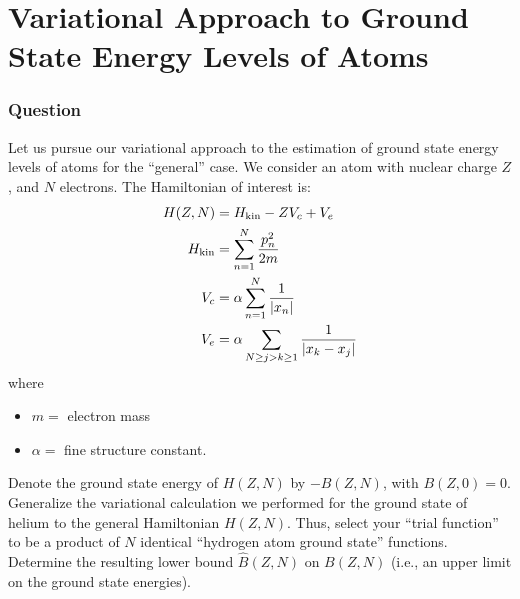 \documentclass{article}[16pt]
\begin{document}
\section{Variational Approach to Ground State Energy Levels of Atoms}
\subsubsection{Question}
Let us pursue our variational approach to the estimation of ground state energy levels of atoms for the “general” case. We consider an atom with nuclear charge $Z$, and $N$ electrons. The Hamiltonian of interest is:
\begin{align*}
    H(Z, N) &= H_{\text{kin}} - ZV_c + V_e \\
    H_{\text{kin}} &= \sum_{n=1}^{N} \frac{p_n^2}{2m} \\
    V_c &= \alpha \sum_{n=1}^{N} \frac{1}{\abs{x_n}} \\
    V_e &= \alpha \sum_{\substack{N \geq j > k \geq 1}} \frac{1}{\abs{x_k - x_j}}
\end{align*}
where
\begin{itemize}
    \item $m =$ electron mass
    \item $\alpha =$ fine structure constant.
\end{itemize}
Denote the ground state energy of $H(Z, N)$ by $-B(Z, N)$, with $B(Z, 0) = 0$. Generalize the variational calculation we performed for the ground state of helium to the general Hamiltonian $H(Z, N)$. Thus, select your “trial function” to be a product of $N$ identical “hydrogen atom ground state” functions. Determine the resulting lower bound $\hat{B}(Z, N)$ on $B(Z, N)$ (i.e., an upper limit on the ground state energies).
\end{document}
